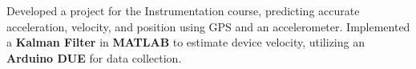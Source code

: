\item{Developed a project for the Instrumentation course, predicting accurate acceleration, velocity, and position using GPS and an accelerometer. Implemented a \textbf{Kalman Filter} in \textbf{MATLAB} to estimate device velocity, utilizing an \textbf{Arduino DUE} for data collection.}

